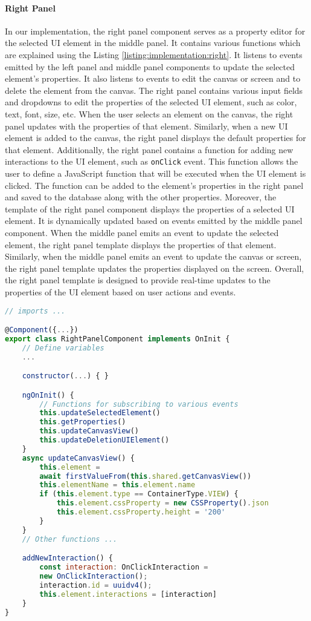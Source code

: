 \paragraph{Right Panel}
In our implementation, the right panel component serves as a property editor for the selected UI element in the middle panel. 
It contains various functions which are explained using the Listing \ref{listing:implementation:right}.
It listens to events emitted by the left panel and middle panel components to update the selected element's properties. 
It also listens to events to edit the canvas or screen and to delete the element from the canvas.
The right panel contains various input fields and dropdowns to edit the properties of the selected UI element, such as color, text, font, size, etc. 
When the user selects an element on the canvas, the right panel updates with the properties of that element. 
Similarly, when a new UI element is added to the canvas, the right panel displays the default properties for that element.
Additionally, the right panel contains a function for adding new interactions to the UI element, such as \texttt{onClick} event. 
This function allows the user to define a JavaScript function that will be executed when the UI element is clicked. 
The function can be added to the element's properties in the right panel and saved to the database along with the other properties.
Moreover, the template of the right panel component displays the properties of a selected UI element. 
It is dynamically updated based on events emitted by the middle panel component. 
When the middle panel emits an event to update the selected element, the right panel template displays the properties of that element. 
Similarly, when the middle panel emits an event to update the canvas or screen, the right panel template updates the properties displayed on the screen. 
Overall, the right panel template is designed to provide real-time updates to the properties of the UI element based on user actions and events.
\clearpage
\begin{lstlisting}[language=JavaScript, caption=right-panel.component.ts, label=listing:implementation:right]
// imports ...

@Component({...})
export class RightPanelComponent implements OnInit {
    // Define variables
    ...

    constructor(...) { }

    ngOnInit() {
        // Functions for subscribing to various events
        this.updateSelectedElement()
        this.getProperties()
        this.updateCanvasView()
        this.updateDeletionUIElement()
    }
    async updateCanvasView() {
        this.element = 
        await firstValueFrom(this.shared.getCanvasView())
        this.elementName = this.element.name
        if (this.element.type == ContainerType.VIEW) {
            this.element.cssProperty = new CSSProperty().json
            this.element.cssProperty.height = '200'
        }
    }
    // Other functions ...

    addNewInteraction() {
        const interaction: OnClickInteraction = 
        new OnClickInteraction();
        interaction.id = uuidv4();
        this.element.interactions = [interaction]
    }
}    
\end{lstlisting}
\clearpage
